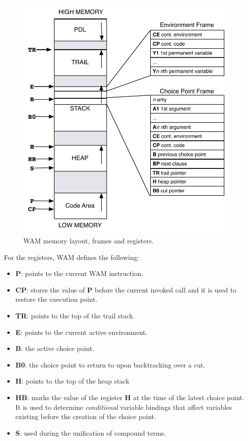 \begin{figure}[ht]
  \centering
    \includegraphics[scale=0.7]{wam.pdf}
  \caption{WAM memory layout, frames and registers.}
  \label{fig:wam}
\end{figure}

For the registers, WAM defines the following:

\begin{itemize}
  \item \textbf{P}: points to the current WAM instruction.
  \item \textbf{CP}: stores the value of \textbf{P} before the current invoked call and it is used to restore the execution point.
  \item \textbf{TR}: points to the top of the trail stack.
  \item \textbf{E}: points to the current active environment.
  \item \textbf{B}: the active choice point.
  \item \textbf{B0}: the choice point to return to upon backtracking over a cut.
  \item \textbf{H}: points to the top of the heap stack
  \item \textbf{HB}: marks the value of the register \textbf{H} at the time of the latest choice point. It is used to
  determine \textit{conditional} variable bindings that affect variables existing before the creation of the choice point.
  \item \textbf{S}: used during the unification of compound terms.
\end{itemize}

